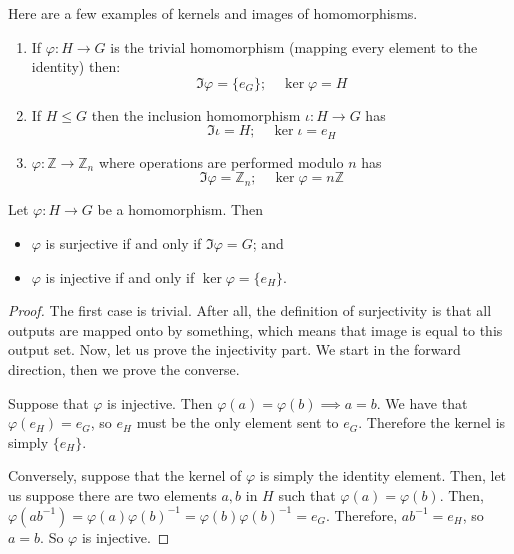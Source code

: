 Here are a few examples of kernels and images of homomorphisms.
\begin{enumerate}
	\item If \(\varphi: H \to G\) is the trivial homomorphism (mapping every element to the identity) then:
	      \[
		      \Im \varphi = \{ e_G \};\quad \ker \varphi = H
	      \]
	\item If \(H \leq G\) then the inclusion homomorphism \(\iota: H \to G\) has
	      \[
		      \Im \iota = H;\quad \ker \iota = e_H
	      \]
	\item \(\varphi: \mathbb Z \to \mathbb Z_n\) where operations are performed modulo \(n\) has
	      \[
		      \Im \varphi = \mathbb Z_n;\quad \ker \varphi = n\mathbb Z
	      \]
\end{enumerate}

\begin{proposition}
	Let \(\varphi: H \to G\) be a homomorphism.
	Then
	\begin{itemize}
		\item \(\varphi\) is surjective if and only if \(\Im \varphi = G\); and
		\item \(\varphi\) is injective if and only if \(\ker \varphi = \{ e_H \}\).
	\end{itemize}
\end{proposition}
\begin{proof}
	The first case is trivial.
	After all, the definition of surjectivity is that all outputs are mapped onto by something, which means that image is equal to this output set.
	Now, let us prove the injectivity part.
	We start in the forward direction, then we prove the converse.

	Suppose that \(\varphi\) is injective.
	Then \(\varphi(a) = \varphi(b) \implies a = b\).
	We have that \(\varphi(e_H) = e_G\), so \(e_H\) must be the only element sent to \(e_G\).
	Therefore the kernel is simply \(\{ e_H \}\).

	Conversely, suppose that the kernel of \(\varphi\) is simply the identity element.
	Then, let us suppose there are two elements \(a, b\) in \(H\) such that \(\varphi(a) = \varphi(b)\).
	Then, \(\varphi(a b^{-1})=\varphi(a)\varphi(b)^{-1} = \varphi(b)\varphi(b)^{-1} = e_G\).
	Therefore, \(ab^{-1} = e_H\), so \(a = b\).
	So \(\varphi\) is injective.
\end{proof}
